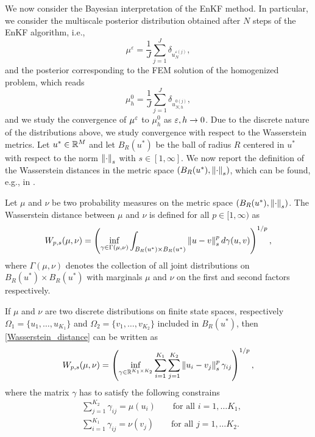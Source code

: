\documentclass[10pt]{article}
\begin{document}
We now consider the Bayesian interpretation of the EnKF method. In particular, we consider the multiscale posterior distribution obtained after $N$ steps of the EnKF algorithm, i.e.,
\[ \mu^{\varepsilon} = \frac{1}{J} \sum_{j=1}^J \delta_{u_N^{\varepsilon(j)}}, \]
and the posterior corresponding to the FEM solution of the homogenized problem, which reads
\[ \mu^0_h = \frac{1}{J} \sum_{j=1}^J \delta_{u_{N,h}^{0(j)}}, \]
and we study the convergence of $\mu^\varepsilon$ to $\mu_h^0$ as $\varepsilon, h \to 0$. Due to the discrete nature of the distributions above, we study convergence with respect to the Wasserstein metrics. Let $u^* \in \mathbb{R}^M$ and let $B_R(u^*)$ be the ball of radius $R$ centered in $u^*$ with respect to the norm $\left\|\cdot\right\|_s$ with $s \in [1,\infty]$. We now report the definition of the Wasserstein distances in the metric space $(B_R(u^*), \left\|\cdot\right\|_s)$, which can be found, e.g., in \cite{San15}.

\begin{definition}
\label{Wasserstein_definition}
Let $\mu$ and $\nu$ be two probability measures on the metric space $(B_R(u^*), \left\|\cdot\right\|_s)$. The Wasserstein distance between $\mu$ and $\nu$ is defined for all $p \in [1, \infty)$ as
\begin{equation}
\label{Wasserstein_distance}
W_{p,s}(\mu, \nu) = \left ( \inf_{\gamma \in \Gamma(\mu, \nu)} \int_{B_R(u^*) \times B_R(u^*)} \left\|u - v\right\|_s^p d \gamma(u,v) \right )^{1/p},
\end{equation}
where $\Gamma(\mu, \nu)$ denotes the collection of all joint distributions on $B_R(u^*) \times B_R(u^*)$ with marginals $\mu$ and $\nu$ on the first and second factors respectively.
\end{definition}

\begin{remark}
If $\mu$ and $\nu$ are two discrete distributions on finite state spaces, respectively $\Omega_1 = \{ u_1, \dots, u_{K_1} \}$ and $\Omega_2 = \{ v_1, \dots, v_{K_2} \}$ included in $B_R(u^*)$, then \eqref{Wasserstein_distance} can be written as
\begin{equation}
\label{Wasserstein_distance_discrete}
W_{p,s}(\mu, \nu) = \left ( \inf_{\gamma \in \mathbb{R}^{K_1 \times K_2}} \sum_{i=1}^{K_1} \sum_{j=1}^{K_2} \left\|u_i - v_j\right\|_s^p \gamma_{ij} \right )^{1/p},
\end{equation}
where the matrix $\gamma$ has to satisfy the following constrains
\begin{align*}
& \sum_{j=1}^{K_2} \gamma_{ij} = \mu(u_i) \qquad \text{for all } i = 1, \dots K_1, \\
& \sum_{i=1}^{K_1} \gamma_{ij} = \nu(v_j) \qquad \text{for all } j = 1, \dots K_2.
\end{align*}
\end{remark}
\end{document}
